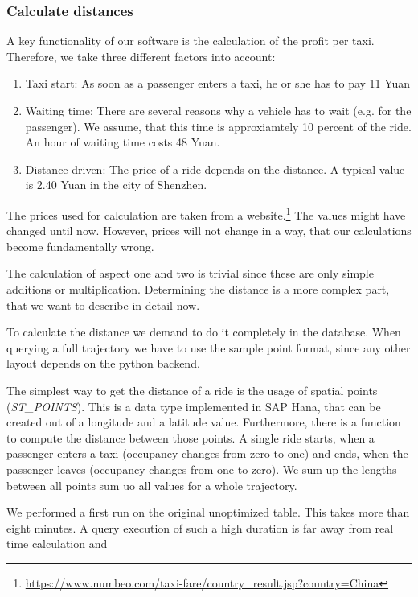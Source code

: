 \documentclass[10pt]{sig-alternate}
\begin{document}
\subsubsection{Calculate distances}
A key functionality of our software is the calculation of the profit per taxi. Therefore, we take three different factors into account:
\begin{enumerate}
    \item Taxi start: As soon as a passenger enters a taxi, he or she has to pay 11 Yuan
    \item Waiting time: There are several reasons why a vehicle has to wait (e.g. for the passenger). We assume, that this time is approxiamtely 10 percent of the ride. An hour of waiting time costs 48 Yuan.
    \item Distance driven: The price of a ride depends on the distance. A typical value is 2.40 Yuan in the city of Shenzhen.
\end{enumerate}
The prices used for calculation are taken from a website.\footnote{\href{https://www.numbeo.com/taxi-fare/country\_result.jsp?country=China}{https://www.numbeo.com/taxi-fare/country\_result.jsp?country=China}} The values might have changed until now. However, prices will not change in a way, that our calculations become fundamentally wrong.

The calculation of aspect one and two is trivial since these are only simple additions or multiplication. Determining the distance is a more complex part, that we want to describe in detail now.

To calculate the distance we demand to do it completely in the database. When querying a full trajectory we have to use the sample point format, since any other layout depends on the python backend.

The simplest way to get the distance of a ride is the usage of spatial points (\textit{ST\_POINTS}). This is a data type implemented in SAP Hana, that can be created out of a longitude and a latitude value. Furthermore, there is a function to compute the distance between those points. A single ride starts, when a passenger enters a taxi (occupancy changes from zero to one) and ends, when the passenger leaves (occupancy changes from one to zero). We sum up the lengths between all points sum uo all values for a whole trajectory.

We performed a first run on the original unoptimized table. This takes more than eight minutes. A query execution of such a high duration is far away from real time calculation and 
\end{document}
